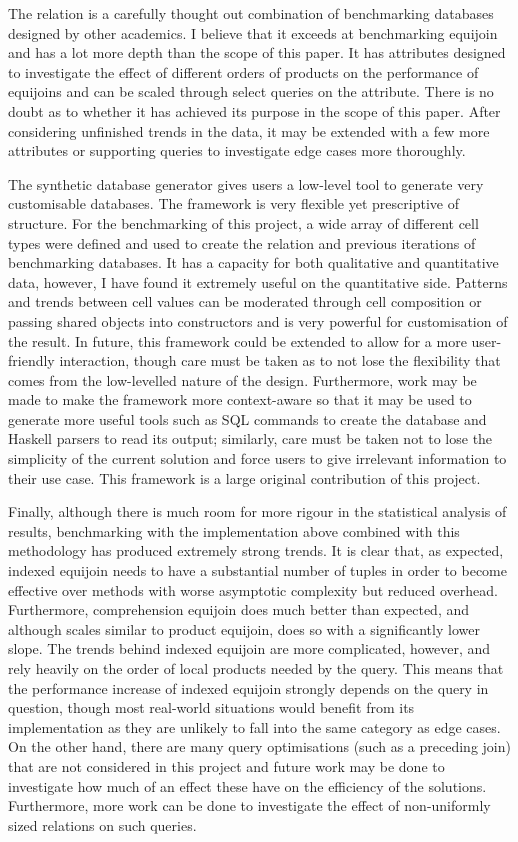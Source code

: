 The  relation is a carefully thought out combination of
benchmarking databases designed by other academics. I
believe that it exceeds at benchmarking equijoin and has a lot more depth than
the scope of this paper. It has attributes designed to investigate the effect of
different orders of products on the performance of equijoins and can be scaled
through select queries on the  attribute. There is no
doubt as to whether it has achieved its purpose in the scope of this paper.
After considering unfinished trends in the data, it may be extended with a few more attributes or
supporting queries to investigate edge cases more thoroughly.

The synthetic database generator gives users a low-level tool to generate very
customisable databases. The framework is very flexible yet prescriptive of
structure. For the benchmarking of this project, a wide array of different cell
types were defined and used to create the  relation and
previous iterations of benchmarking databases. It has a capacity for both
qualitative and quantitative data, however, I have found it extremely useful on the
quantitative side. Patterns and trends between cell values can be moderated
through cell composition or passing shared objects into constructors and is very
powerful for customisation of the result. In future, this framework could be
extended to allow for a more user-friendly interaction, though care must be
taken as to not lose the flexibility that comes from the low-levelled nature of
the design. Furthermore, work may be made to make the framework more context-aware so that it may be used to generate more useful tools such as SQL commands
to create the database and Haskell parsers to read its output; similarly, care
must be taken not to lose the simplicity of the current solution and force users
to give irrelevant information to their use case. This framework is a large
original contribution of this project.

Finally, although there is much room for more rigour in the statistical analysis
of results, benchmarking with the implementation above combined with this methodology has
produced extremely strong trends. It is clear that, as expected, indexed
equijoin needs to have a substantial number of tuples in order to become
effective over methods with worse asymptotic complexity but reduced overhead.
Furthermore, comprehension equijoin does much better than expected, and although
scales similar to product equijoin, does so with a significantly lower slope.
The trends behind indexed equijoin are more complicated, however, and rely
heavily on the order of local products needed by the query. This
means that the performance increase of indexed equijoin strongly depends on the
query in question, though most real-world situations would benefit from its
implementation as they are unlikely to fall into the same category as edge
cases. On the other hand, there are many query optimisations (such as a
preceding join) that are not considered in this project and future work may be
done to investigate how much of an effect these have on the efficiency of the
solutions. Furthermore, more work can be done to investigate the effect of
non-uniformly sized relations on such queries.

